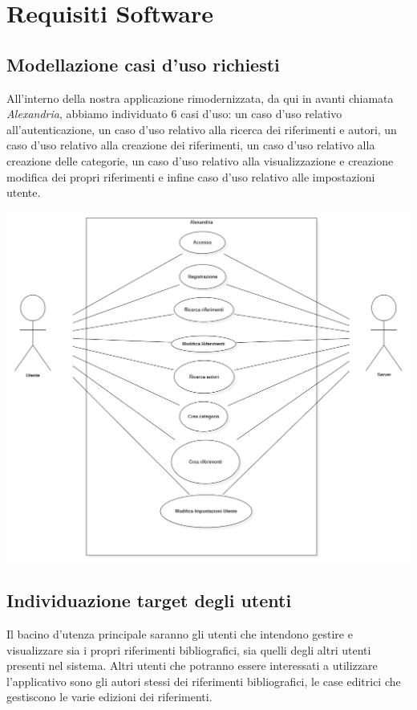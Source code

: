 \chapter{Requisiti Software}
\raggedright{\section{Modellazione casi d'uso richiesti}}
All'interno della nostra applicazione rimodernizzata, da qui in avanti chiamata \textit{Alexandria}, abbiamo individuato 6 casi d'uso: un caso d'uso relativo all'autenticazione, un caso d'uso relativo alla ricerca dei riferimenti e autori, un caso d'uso relativo alla creazione dei riferimenti, un caso d'uso relativo alla creazione delle categorie, un caso d'uso relativo alla visualizzazione e creazione modifica dei propri riferimenti e infine caso d'uso relativo alle impostazioni utente.
         \begin{center}
     \hspace{-1cm}
            \includegraphics[width=.90\textwidth]{Immagini/Alexandria/useCase.png} 
        \end{center}


\raggedright{\section{Individuazione target degli utenti}}
Il bacino d'utenza principale saranno gli utenti che intendono gestire e visualizzare sia i propri riferimenti bibliografici, sia quelli degli altri utenti presenti nel sistema. Altri utenti che potranno essere interessati a utilizzare l'applicativo sono gli autori stessi dei riferimenti bibliografici, le case editrici che gestiscono le varie edizioni dei riferimenti. 

